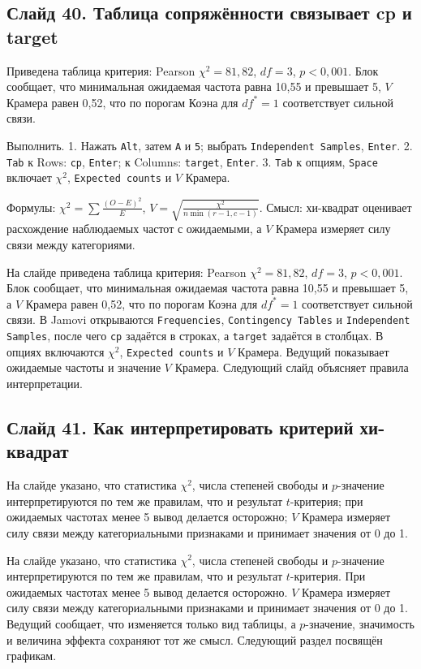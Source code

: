 \documentclass[11pt,a4paper]{article}
\begin{document}
\subsection*{Слайд 40. Таблица сопряжённости связывает cp и target}
\begin{onslide}
Приведена таблица критерия: Pearson $\chi^2 = 81{,}82$, $df = 3$, $p < 0{,}001$. Блок сообщает, что минимальная ожидаемая частота равна 10,55 и превышает 5, $V$ Крамера равен 0,52, что по порогам Коэна для $df^*=1$ соответствует сильной связи.
\end{onslide}
\begin{jamovi}
Выполнить. 1. Нажать \texttt{Alt}, затем \texttt{A} и \texttt{5}; выбрать \texttt{Independent Samples}, \texttt{Enter}. 2. \texttt{Tab} к Rows: \texttt{cp}, \texttt{Enter}; к Columns: \texttt{target}, \texttt{Enter}. 3. \texttt{Tab} к опциям, \texttt{Space} включает $\chi^2$, \texttt{Expected counts} и $V$ Крамера.
\par Формулы: $\chi^2=\sum\frac{(O-E)^2}{E}$, $V=\sqrt{\frac{\chi^2}{n\min(r-1,c-1)}}$. Смысл: хи-квадрат оценивает расхождение наблюдаемых частот с ожидаемыми, а $V$ Крамера измеряет силу связи между категориями.
\end{jamovi}
На слайде приведена таблица критерия: Pearson $\chi^2 = 81{,}82$, $df = 3$, $p < 0{,}001$. Блок сообщает, что минимальная ожидаемая частота равна 10,55 и превышает 5, а $V$ Крамера равен 0,52, что по порогам Коэна для $df^*=1$ соответствует сильной связи. В Jamovi открываются \texttt{Frequencies}, \texttt{Contingency Tables} и \texttt{Independent Samples}, после чего \texttt{cp} задаётся в строках, а \texttt{target} задаётся в столбцах. В опциях включаются $\chi^2$, \texttt{Expected counts} и $V$ Крамера. Ведущий показывает ожидаемые частоты и значение $V$ Крамера. Следующий слайд объясняет правила интерпретации.

\subsection*{Слайд 41. Как интерпретировать критерий хи-квадрат}
\begin{onslide}
На слайде указано, что статистика $\chi^2$, числа степеней свободы и $p$-значение интерпретируются по тем же правилам, что и результат $t$-критерия; при ожидаемых частотах менее 5 вывод делается осторожно; $V$ Крамера измеряет силу связи между категориальными признаками и принимает значения от 0 до 1.
\end{onslide}
На слайде указано, что статистика $\chi^2$, числа степеней свободы и $p$-значение интерпретируются по тем же правилам, что и результат $t$-критерия. При ожидаемых частотах менее 5 вывод делается осторожно. $V$ Крамера измеряет силу связи между категориальными признаками и принимает значения от 0 до 1. Ведущий сообщает, что изменяется только вид таблицы, а $p$-значение, значимость и величина эффекта сохраняют тот же смысл. Следующий раздел посвящён графикам.
\end{document}
